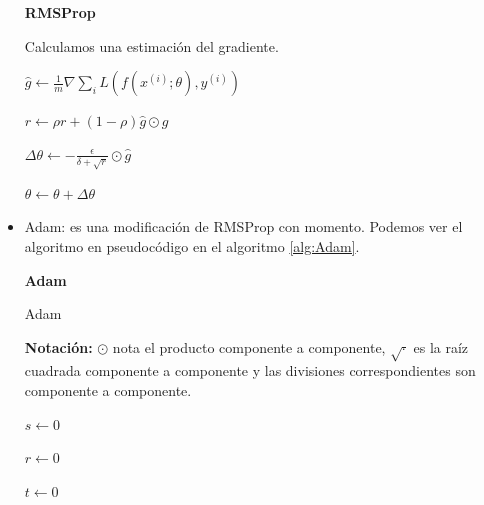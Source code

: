 \begin{itemize}
\begin{algorithm}[]{\Large{\textbf{RMSProp}}}
{			Calculamos una estimación del gradiente.
			
			$\hat{g} \leftarrow \frac{1}{m}\nabla \sum_{i} L(f(x^{(i)};\theta), y^{(i)})$
			
			$r\leftarrow \rho r + (1-\rho)\hat{g}\odot \hat{g}$
			
			$\Delta \theta \leftarrow - \frac{\epsilon}{\delta + \sqrt{r}} \odot \hat{g}$
			
			$\theta \leftarrow \theta + \Delta \theta$
			
		}
		
		\vspace{10px}
		
		
		\vspace{5px}
	\end{algorithm}

	\item Adam: es una modificación de RMSProp con momento. Podemos ver el algoritmo en pseudocódigo en el algoritmo \ref{alg:Adam}.
	
	\begin{algorithm}[]{\Large{\textbf{Adam}}}
		
		\vspace{15px}
		
		\caption{Adam}
		\label{alg:Adam}
		\textbf{Notación:} $\odot$ nota el producto componente a componente, $\sqrt{\cdot}$ es la raíz cuadrada componente a componente y las divisiones correspondientes son componente a componente.
		
		\KwIn{Tasas de decaimiento $\rho_1 , \rho_2 \in [0,1)$}
		
		\vspace{10px}
		
		$s\leftarrow 0$
		
		$r\leftarrow 0$
		
		$t\leftarrow 0$
		
\end{algorithm}
\end{itemize}
